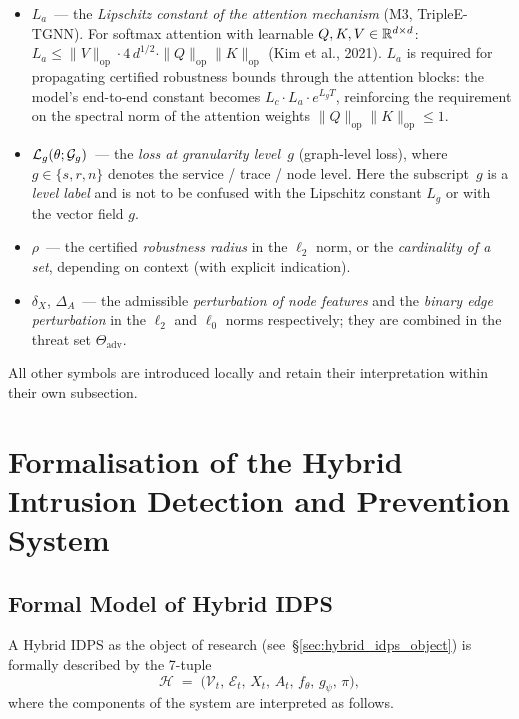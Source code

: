 \begin{itemize}[leftmargin=2em, itemsep=0pt]
\item $L_a$~--- the \emph{Lipschitz constant of the attention
mechanism} (M3, TripleE-TGNN). For softmax attention with
learnable $Q,K,V\in\mathbb{R}^{d\times d}$: $L_a\le
\|V\|_{\mathrm{op}}\cdot 4\,d^{1/2}\cdot \|Q\|_{\mathrm{op}}
\|K\|_{\mathrm{op}}$ (Kim et al., 2021). $L_a$ is required for
propagating certified robustness bounds through the attention
blocks: the model's end-to-end constant becomes $L_c\cdot
L_a\cdot e^{L_g T}$, reinforcing the requirement on the
spectral norm of the attention weights
$\|Q\|_{\mathrm{op}}\|K\|_{\mathrm{op}}\le 1$.

\item $\mathcal{L}_g(\theta;\mathcal{G}_g)$~--- the \emph{loss at granularity
level~$g$} (graph-level loss), where $g\in\{s,r,n\}$ denotes the
service / trace / node level. Here the subscript~$g$ is a
\emph{level label} and is not to be confused with the Lipschitz
constant $L_g$ or with the vector field $g$.

\item $\rho$~--- the certified \emph{robustness radius} in the
$\ell_2$ norm, or the \emph{cardinality of a set}, depending on
context (with explicit indication).

\item $\delta_X$, $\Delta_A$~--- the admissible \emph{perturbation
of node features} and the \emph{binary edge perturbation} in the
$\ell_2$ and $\ell_0$ norms respectively; they are combined in
the threat set $\Theta_{\mathrm{adv}}$.

\end{itemize}

\noindent All other symbols are introduced locally and retain
their interpretation within their own subsection.
\section{Formalisation of the Hybrid Intrusion Detection and Prevention System}
\label{sec:hybrid_idps_math_model}

\subsection{Formal Model of Hybrid IDPS}
\label{subsec:idps_formal_model}

A Hybrid IDPS as the object of research (see~\S\ref{sec:hybrid_idps_object})
is formally described by the 7-tuple
\begin{equation}
\mathcal{H} \;=\; \bigl(\mathcal{V}_t,\,\mathcal{E}_t,\,X_t,\,A_t,\,
f_\theta,\,g_\psi,\,\pi\bigr),
\label{eq:hybrid_idps_tuple}
\end{equation}where the components of the system are interpreted as follows.

